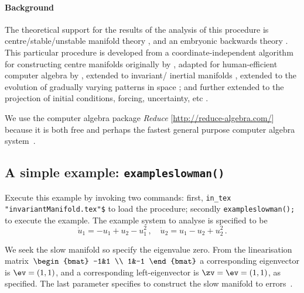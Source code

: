 \documentclass[11pt,a5paper]{article}
\def\eps{\varepsilon}
\begin{document}
\paragraph{Background}
The theoretical support for the results of the analysis of
this procedure is centre\slash stable\slash unstable
manifold theory \cite[e.g.,][]{Carr81, Haragus2011,
Roberts2014a}, and an embryonic backwards theory
\cite[]{Roberts2018a}. This particular procedure is
developed from a coordinate-independent algorithm for
constructing centre manifolds originally by
\cite{Coullet83}, adapted for human-efficient computer
algebra by \cite{Roberts96a}, extended to invariant\slash
inertial manifolds \cite[]{Roberts89, Foias88b}, extended to
the evolution of gradually varying patterns in space
\cite[]{Roberts88a, Roberts2013a, Bunder2018a}; and further 
extended to the projection of initial conditions, forcing, 
uncertainty, etc \cite[]{Roberts89b, Roberts97b}.

We use the computer algebra package \emph{Reduce} 
[\url{http://reduce-algebra.com/}] because it is both free 
and perhaps the fastest general purpose computer algebra 
system~\cite[e.g.]{Fateman2002}.



\subsection{A simple example: \texttt{exampleslowman()}} 
\label{ss:eg}
Execute this example by invoking two commands: first,
\verb|in_tex "invariantManifold.tex"$| to load the procedure;
secondly \verb|exampleslowman();| to execute the example. 
The example system to analyse is specified to be 
\cite[Example~2.1]{Roberts2014a}
\begin{equation*}
\dot u_1=-u_1+u_2-u_1^2\,, \quad \dot u_2=u_1-u_2+u_2^2\,.
\end{equation*}
We seek the slow manifold so specify the eigenvalue zero.
From the linearisation matrix~\(\begin{bmat} -1&1 \\ 1&-1
\end{bmat}\) a corresponding eigenvector is \(\ev=(1,1)\),
and a corresponding left-eigenvector is \(\zv=\ev=(1,1)\),
as specified. The last parameter specifies to construct the
slow manifold to errors~\Ord{\eps^5}.
\end{document}
